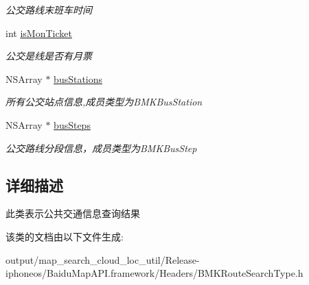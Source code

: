 \begin{DoxyCompactItemize}
\begin{DoxyCompactList}\small\item\em 公交路线末班车时间 \end{DoxyCompactList}\item 
\hypertarget{interface_b_m_k_bus_line_result_a2c311dc1e3378a192ffacdb2c3654ade}{}int \hyperlink{interface_b_m_k_bus_line_result_a2c311dc1e3378a192ffacdb2c3654ade}{is\+Mon\+Ticket}\label{interface_b_m_k_bus_line_result_a2c311dc1e3378a192ffacdb2c3654ade}

\begin{DoxyCompactList}\small\item\em 公交是线是否有月票 \end{DoxyCompactList}\item 
\hypertarget{interface_b_m_k_bus_line_result_a9fe3884161bea9c3955a65eebbb00d70}{}N\+S\+Array $\ast$ \hyperlink{interface_b_m_k_bus_line_result_a9fe3884161bea9c3955a65eebbb00d70}{bus\+Stations}\label{interface_b_m_k_bus_line_result_a9fe3884161bea9c3955a65eebbb00d70}

\begin{DoxyCompactList}\small\item\em 所有公交站点信息,成员类型为\+B\+M\+K\+Bus\+Station \end{DoxyCompactList}\item 
\hypertarget{interface_b_m_k_bus_line_result_acbb640c72f6b2649ee131c95fd826407}{}N\+S\+Array $\ast$ \hyperlink{interface_b_m_k_bus_line_result_acbb640c72f6b2649ee131c95fd826407}{bus\+Steps}\label{interface_b_m_k_bus_line_result_acbb640c72f6b2649ee131c95fd826407}

\begin{DoxyCompactList}\small\item\em 公交路线分段信息，成员类型为\+B\+M\+K\+Bus\+Step \end{DoxyCompactList}\end{DoxyCompactItemize}


\subsection{详细描述}
此类表示公共交通信息查询结果 

该类的文档由以下文件生成\+:\begin{DoxyCompactItemize}
\item 
output/map\+\_\+search\+\_\+cloud\+\_\+loc\+\_\+util/\+Release-\/iphoneos/\+Baidu\+Map\+A\+P\+I.\+framework/\+Headers/B\+M\+K\+Route\+Search\+Type.\+h\end{DoxyCompactItemize}
